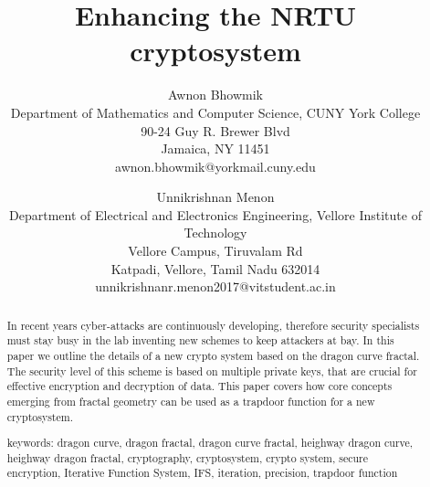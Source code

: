 \documentclass[a4paper,12pt]{article}
\begin{document}
\title{Enhancing the NRTU cryptosystem} %

\author{ 
   \large Awnon Bhowmik \\[-3pt]
   \normalsize Department of Mathematics and Computer Science, CUNY York College  \\[-3pt]
    \normalsize 90-24 Guy R. Brewer Blvd \\[-3pt]
    \normalsize Jamaica, NY 11451 \\[-3pt]
    \normalsize	awnon.bhowmik@yorkmail.cuny.edu \\[-3pt]
  \and
   \large Unnikrishnan Menon \\[-3pt]
   \normalsize Department of Electrical and Electronics Engineering, Vellore Institute of Technology  \\[-3pt]
    \normalsize Vellore Campus, Tiruvalam Rd \\[-3pt]
    \normalsize Katpadi, Vellore,
Tamil Nadu 632014 \\[-3pt]
    \normalsize	unnikrishnanr.menon2017@vitstudent.ac.in \\[-3pt]
}


\maketitle



\begin{abstract} 
  In recent years cyber-attacks are continuously developing, therefore security specialists must stay busy in the lab inventing new schemes to keep attackers at bay. In this paper we outline the details of a new crypto system based on the dragon curve fractal. The security level of this scheme is based on multiple private keys, that are crucial for effective encryption and decryption of data. This paper covers how core concepts emerging from fractal geometry can be used as a trapdoor function for a new cryptosystem.
  
  \begin{flushleft}
  keywords: dragon curve, dragon fractal, dragon curve fractal, heighway dragon curve, heighway dragon fractal, cryptography, cryptosystem, crypto system, secure encryption, Iterative Function System, IFS, iteration, precision, trapdoor function
  \end{flushleft}
\end{abstract}
\end{document}
